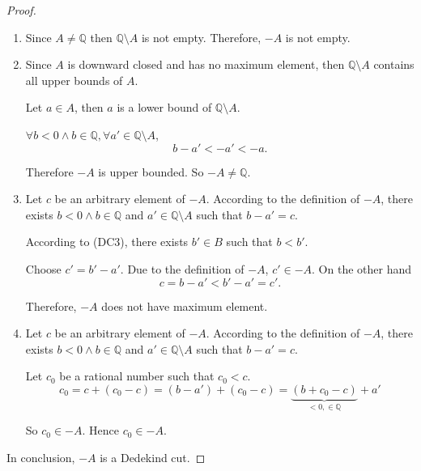 \begin{proof}
    \begin{enumerate}[label = (\roman*)]
        \item Since $ A\ne\mathbb{Q}$ then $\mathbb{Q}\setminus A$ is not empty. Therefore, $- A$ is not empty.
        \item Since $ A$ is downward closed and has no maximum element, then $\mathbb{Q}\setminus A$ contains all upper bounds of $ A$.
              \par Let $a\in A$, then $a$ is a lower bound of $\mathbb{Q}\setminus A$.
              \par $\forall b < 0 \wedge b\in\mathbb{Q}, \forall a'\in\mathbb{Q}\setminus A$,
              \[
                  b - a' < -a' < -a.
              \]
              \par Therefore $- A$ is upper bounded. So $-A\ne\mathbb{Q}$.
        \item Let $c$ be an arbitrary element of $- A$. According to the definition of $- A$, there exists $b < 0\wedge b\in\mathbb{Q}$ and $a'\in\mathbb{Q}\setminus A$ such that $b - a' = c$.
              \par According to (DC3), there exists $b'\in B$ such that $b < b'$.
              \par Choose $c' = b' - a'$. Due to the definition of $-A$, $c'\in -A$. On the other hand
              \[
                  c = b - a' < b' - a' = c'.
              \]
              \par Therefore, $-A$ does not have maximum element.
        \item Let $c$ be an arbitrary element of $-A$. According to the definition of $- A$, there exists $b < 0\wedge b\in\mathbb{Q}$ and $a'\in\mathbb{Q}\setminus A$ such that $b - a' = c$.
              \par Let $c_{0}$ be a rational number such that $c_{0} < c$.
              \[
                  c_{0} = c + (c_{0} - c) = (b - a') + (c_{0} - c) = \underbrace{(b + c_{0} - c)}_{< 0, \in\mathbb{Q}} + a'
              \]
              \par So $c_{0}\in -A$. Hence $c_{0}\in -A$.
    \end{enumerate}
    \par In conclusion, $-A$ is a Dedekind cut.
\end{proof}

